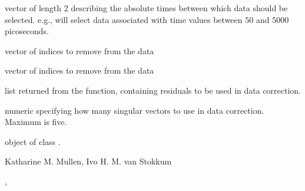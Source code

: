 \documentclass{article}
\begin{document}
\begin{Arguments}
\begin{ldescription}
\item[\code{sel\_time\_ab}] vector of length 2 describing the absolute times 
between which data should be
selected.   e.g.,  will select data  
associated with time values between 50 and 5000 picoseconds.
\item[\code{rm\_x2}] vector of  indices to remove from the data
\item[\code{rm\_x}] vector of  indices to remove from the data
\item[\code{svdResid}] list returned from the  function, containing
residuals to be used in data correction. 
\item[\code{numV}] numeric specifying how many singular vectors to use in data
correction.  Maximum is five. 
\end{ldescription}
\end{Arguments}
\begin{Value}
object of class .
\end{Value}
\begin{Author}\relax
Katharine M. Mullen, Ivo H. M. van Stokkum
\end{Author}
\begin{SeeAlso}\relax
{}, 
\end{SeeAlso}
\end{document}

